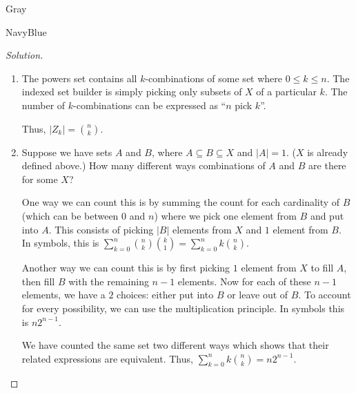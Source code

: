 \documentclass[12pt]{amsart}
\theoremstyle{named}
\newenvironment{soln}
{\begin{color}{Gray}\begin{framed}\begin{color}{NavyBlue}\begin{proof}[Solution]
\doublespacing}
{\end{proof}\end{color}\end{framed}\end{color}}
\theoremstyle{definition}
\begin{document}
\begin{soln}
	\phantom{ }

	\begin{enumerate}
		\item The powers set contains all $k$-combinations of some set
		where $0 \leq k \leq n$. The indexed set builder is simply picking 
		only subsets of $X$ of a particular $k$. The number of $k$-combinations
		can be expressed as ``$n$ pick $k$''.

		\noindent Thus, $\displaystyle |Z_k| = {n \choose k}$.
		
		\phantom{ }

		\item Suppose we have sets $A$ and $B$, where $A \subseteq B
		\subseteq X$ and $|A| = 1$. ($X$ is already defined above.)
		How many different ways combinations of $A$ and $B$ are there
		for some $X$?

		\phantom{ }

		\noindent One way we can count this is by summing the count for
		each cardinality of $B$ (which can be between $0$ and $n$) where we pick one element from $B$ and put into
		$A$. This consists of picking $|B|$ elements from $X$ and $1$ element from $B$.
		In symbols, this is 
		$\displaystyle \sum_{k=0}^n{n \choose k}{k\choose 1} = \sum_{k=0}^nk{n \choose k}$.

		\phantom{ }

		\noindent Another way we can count this is by first picking $1$ element from
		$X$ to fill $A$, then fill $B$ with the remaining $n-1$ elements. Now for
		each of these $n-1$ elements, we have a $2$ choices: either put into $B$
		or leave out of $B$. To account for every possibility, we can use the multiplication
		principle. In symbols this is $\displaystyle n2^{n-1}$.

		\phantom{ }

		\noindent We have counted the same set two different ways which 
		shows that their related expressions are equivalent. Thus,
		$\displaystyle\sum_{k=0}^nk{n \choose k} = \displaystyle n2^{n-1}$. 

	\end{enumerate}

\end{soln}
\end{document}
